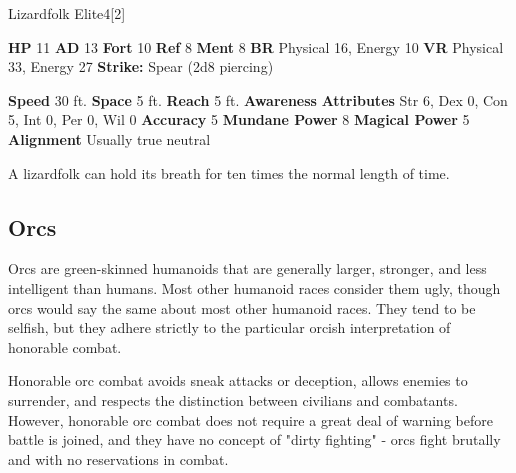   \begin{monsubsection}{Lizardfolk Elite}{4}[2]
    \vspace{-1em}\vspace{-1em}
    \vspace{0em}

    
    

    \begin{spellcontent}
      \begin{spelltargetinginfo}
        \pari \textbf{HP} 11 \monsep
          \textbf{AD} 13 \monsep
          \textbf{Fort} 10 \monsep
          \textbf{Ref} 8 \monsep
          \textbf{Ment} 8
        \pari \textbf{BR} Physical 16, Energy 10 \monsep
        \textbf{VR} Physical 33, Energy 27
        \pari \textbf{Strike:}
            Spear  (2d8 piercing)
      \end{spelltargetinginfo}
    \end{spellcontent}
    \begin{monsterfooter}
      \pari \textbf{Speed} 30 ft. \monsep
        \textbf{Space} 5 ft. \monsep
        \textbf{Reach} 5 ft.
      \pari \textbf{Awareness} 
      \pari \textbf{Attributes}
        Str 6, Dex 0,
        Con 5, Int 0,
        Per 0, Wil 0
      \pari \textbf{Accuracy} 5 \monsep
        \textbf{Mundane Power} 8 \monsep
      \textbf{Magical Power} 5
      \pari \textbf{Alignment} Usually true neutral
    \end{monsterfooter}
  \end{monsubsection}
   A lizardfolk can hold its breath for ten times the normal length of time.
  
  
    \subsection{Orcs}
      
      Orcs are green-skinned humanoids that are generally larger, stronger, and less intelligent than humans.
      Most other humanoid races consider them ugly, though orcs would say the same about most other humanoid races.
      They tend to be selfish, but they adhere strictly to the particular orcish interpretation of honorable combat.
    
      Honorable orc combat avoids sneak attacks or deception, allows enemies to surrender, and respects the distinction between civilians and combatants.
      However, honorable orc combat does not require a great deal of warning before battle is joined, and they have no concept of "dirty fighting" - orcs fight brutally and with no reservations in combat.

